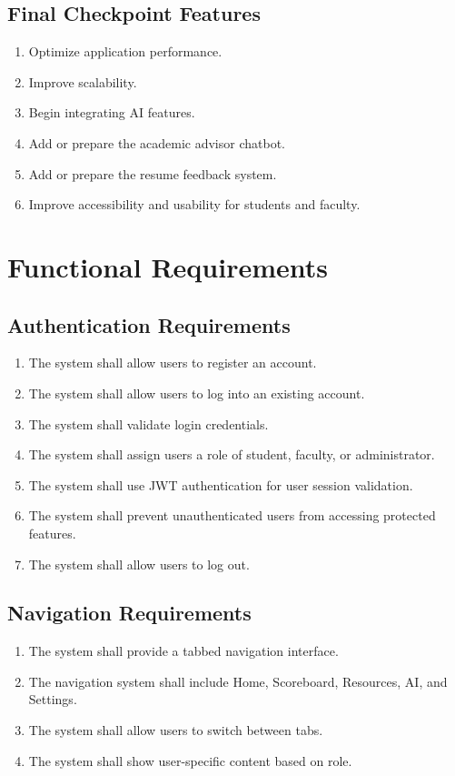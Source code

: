 \documentclass{scrreprt}
\begin{document}
\subsection{Final Checkpoint Features}
\begin{enumerate}
    \item Optimize application performance.
    \item Improve scalability.
    \item Begin integrating AI features.
    \item Add or prepare the academic advisor chatbot.
    \item Add or prepare the resume feedback system.
    \item Improve accessibility and usability for students and faculty.
\end{enumerate}

\section{Functional Requirements}

\subsection{Authentication Requirements}
\begin{enumerate}
    \item The system shall allow users to register an account.
    \item The system shall allow users to log into an existing account.
    \item The system shall validate login credentials.
    \item The system shall assign users a role of student, faculty, or administrator.
    \item The system shall use JWT authentication for user session validation.
    \item The system shall prevent unauthenticated users from accessing protected features.
    \item The system shall allow users to log out.
\end{enumerate}

\subsection{Navigation Requirements}
\begin{enumerate}
    \item The system shall provide a tabbed navigation interface.
    \item The navigation system shall include Home, Scoreboard, Resources, AI, and Settings.
    \item The system shall allow users to switch between tabs.
    \item The system shall show user-specific content based on role.
\end{enumerate}
\end{document}
